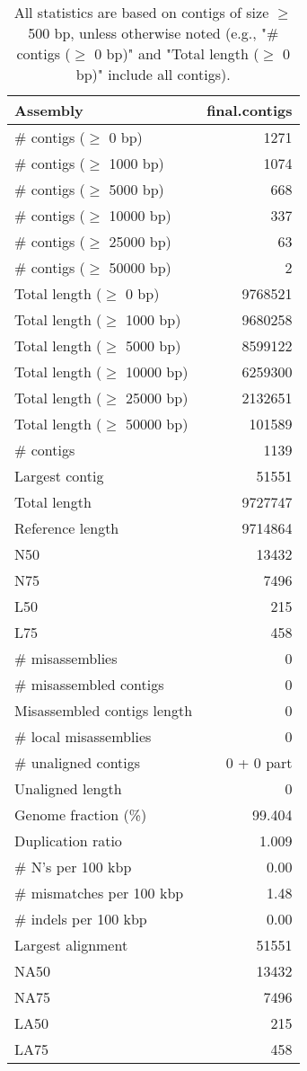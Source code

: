 \documentclass[12pt,a4paper]{article}
\begin{document}
\begin{table}[ht]
\begin{center}
\caption{All statistics are based on contigs of size $\geq$ 500 bp, unless otherwise noted (e.g., "\# contigs ($\geq$ 0 bp)" and "Total length ($\geq$ 0 bp)" include all contigs).}
\begin{tabular}{|l*{1}{|r}|}
\hline
Assembly & final.contigs \\ \hline
\# contigs ($\geq$ 0 bp) & 1271 \\ \hline
\# contigs ($\geq$ 1000 bp) & 1074 \\ \hline
\# contigs ($\geq$ 5000 bp) & 668 \\ \hline
\# contigs ($\geq$ 10000 bp) & 337 \\ \hline
\# contigs ($\geq$ 25000 bp) & 63 \\ \hline
\# contigs ($\geq$ 50000 bp) & 2 \\ \hline
Total length ($\geq$ 0 bp) & 9768521 \\ \hline
Total length ($\geq$ 1000 bp) & 9680258 \\ \hline
Total length ($\geq$ 5000 bp) & 8599122 \\ \hline
Total length ($\geq$ 10000 bp) & 6259300 \\ \hline
Total length ($\geq$ 25000 bp) & 2132651 \\ \hline
Total length ($\geq$ 50000 bp) & 101589 \\ \hline
\# contigs & 1139 \\ \hline
Largest contig & 51551 \\ \hline
Total length & 9727747 \\ \hline
Reference length & 9714864 \\ \hline
N50 & 13432 \\ \hline
N75 & 7496 \\ \hline
L50 & 215 \\ \hline
L75 & 458 \\ \hline
\# misassemblies & 0 \\ \hline
\# misassembled contigs & 0 \\ \hline
Misassembled contigs length & 0 \\ \hline
\# local misassemblies & 0 \\ \hline
\# unaligned contigs & 0 + 0 part \\ \hline
Unaligned length & 0 \\ \hline
Genome fraction (\%) & 99.404 \\ \hline
Duplication ratio & 1.009 \\ \hline
\# N's per 100 kbp & 0.00 \\ \hline
\# mismatches per 100 kbp & 1.48 \\ \hline
\# indels per 100 kbp & 0.00 \\ \hline
Largest alignment & 51551 \\ \hline
NA50 & 13432 \\ \hline
NA75 & 7496 \\ \hline
LA50 & 215 \\ \hline
LA75 & 458 \\ \hline
\end{tabular}
\end{center}
\end{table}
\end{document}
